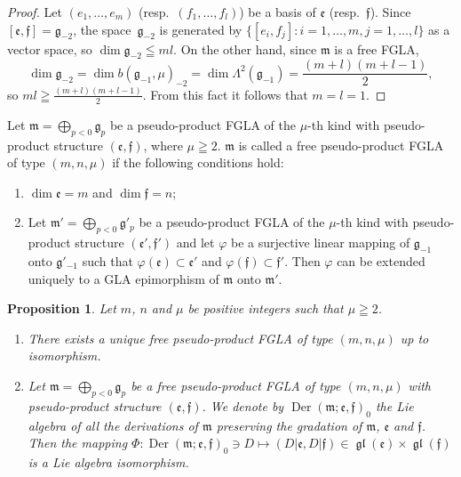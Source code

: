 \documentclass[11pt]{article}
\newtheorem{proposition}{Proposition}
\numberwithin{equation}{section}
\numberwithin{theorem}{section}
\numberwithin{proposition}{section}
\numberwithin{lemma}{section}
\numberwithin{corollary}{section}
\numberwithin{definition}{section}
\numberwithin{example}{section}
\numberwithin{remark}{section}
\numberwithin{note}{section}
\newcommand{\gl}{\operatorname{\mathfrak{gl}}}
\newcommand{\Der}{\operatorname{Der}}
\begin{document}
\begin{proof} Let $(e_1,\dots,e_m)$ (resp.\ $(f_1,\dots,f_l)$) be a basis of
$\mathfrak e$ (resp.~$\mathfrak f$).
Since $[\mathfrak e,\mathfrak f]=\mathfrak g_{-2}$,
the space~$\mathfrak g_{-2}$ is generated by
$\{[e_i,f_j]:i=1,\dots,m,j=1,\dots,l\}$ as a vector space, so
$\dim \mathfrak g_{-2}\leqq ml$. On the other hand,
since $\mathfrak m$ is a free FGLA,
\[
\dim \mathfrak g_{-2}=\dim b(\mathfrak g_{-1},\mu)_{-2}=
\dim \Lambda^2(\mathfrak g_{-1})=\frac{(m+l)(m+l-1)}{2},
\]
so $ml\geqq \frac{(m+l)(m+l-1)}{2}$.
From this fact it follows that $m=l=1$.
\end{proof}

Let $\mathfrak m=\bigoplus\limits_{p<0}\mathfrak g_p$ be a pseudo-product FGLA
of the $\mu$-th kind with
pseudo-product structure $(\mathfrak e,\mathfrak f)$, where $\mu\geqq2$.
$\mathfrak m$ is called a free pseudo-product FGLA
of type $(m,n,\mu)$ if the following conditions hold:
\begin{enumerate}\itemsep=0pt
\renewcommand{\labelenumi}{$(\roman{enumi})$}
\item $\dim\mathfrak e=m$ and $\dim\mathfrak f=n$;
\item Let $\mathfrak m'=\bigoplus\limits_{p<0}\mathfrak g'_p$ be a pseudo-product FGLA of the $\mu$-th kind with
pseudo-product structure $(\mathfrak e',\mathfrak f')$
and let $\varphi$ be a surjective linear mapping of $\mathfrak g_{-1}$ onto
$\mathfrak g'_{-1}$ such that
$\varphi(\mathfrak e)\subset\mathfrak e'$ and
$\varphi(\mathfrak f)\subset\mathfrak f'$.
Then $\varphi$ can be extended uniquely to a GLA
epimorphism of $\mathfrak m$ onto $\mathfrak m'$.
\end{enumerate}
\begin{proposition}\label{prop8.2} Let $m$, $n$ and $\mu$ be positive integers such that $\mu\geqq2$.
\begin{enumerate}\itemsep=0pt
\item There exists a unique free pseudo-product FGLA
of type
$(m,n,\mu)$ up to isomorphism.
\item Let $\mathfrak m=\bigoplus\limits_{p<0}\mathfrak g_p$ be a free
pseudo-product FGLA of type $(m,n,\mu)$
with pseudo-product structure $(\mathfrak e,\mathfrak f)$.
We denote by $\Der(\mathfrak m;\mathfrak e,\mathfrak f)_0$ the Lie algebra of
all the derivations of $\mathfrak m$ preserving the gradation of $\mathfrak m$, $\mathfrak e$ and $\mathfrak f$.
Then the mapping $\Phi:\Der(\mathfrak m;\mathfrak e,\mathfrak f)_0\ni D\mapsto (D|\mathfrak e,D|\mathfrak f)\in\gl(\mathfrak e)\times\gl(\mathfrak f)$ is a Lie algebra isomorphism.
\end{enumerate}
\end{proposition}
\end{document}
